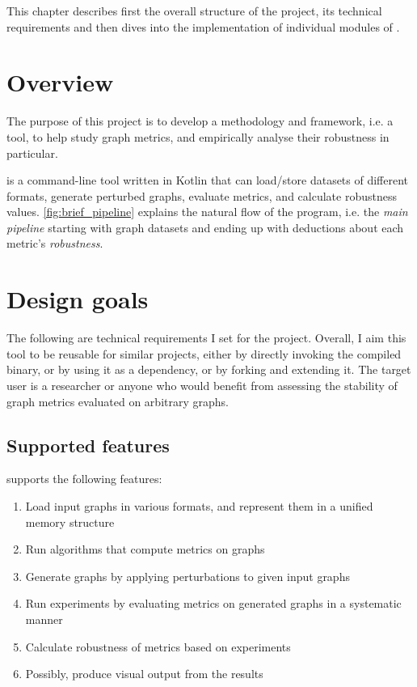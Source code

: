 This chapter describes first the overall structure of the project, its technical requirements and then dives into the implementation of individual modules of \graffs.


\section{Overview}

The purpose of this project is to develop a methodology and framework, i.e. a tool, to help study graph metrics, and empirically analyse their robustness in particular.

\graffs is a command-line tool written in Kotlin that can load/store datasets of different formats, generate perturbed graphs, evaluate metrics, and calculate robustness values. \autoref{fig:brief_pipeline} explains the natural flow of the program, i.e. the \textsl{main pipeline} starting with graph datasets and ending up with deductions about each metric's \textsl{robustness}.




\section{Design goals}\label{sec:design-goals}

The following are technical requirements I set for the project.
Overall, I aim this tool to be reusable for similar projects, either by directly invoking the compiled binary, or by using it as a dependency, or by forking and extending it.
The target user is a researcher or anyone who would benefit from assessing the stability of graph metrics evaluated on arbitrary graphs.

\subsection{Supported features}

\graffs supports the following features:

\begin{enumerate}[itemsep=-2pt,topsep=0pt]
    \item Load input graphs in various formats, and represent them in a unified memory structure
    \item Run algorithms that compute metrics on graphs
    \item Generate graphs by applying perturbations to given input graphs
    \item Run experiments by evaluating metrics on generated graphs in a systematic manner
    \item Calculate robustness of metrics based on experiments
    \item Possibly, produce visual output from the results
\end{enumerate}

